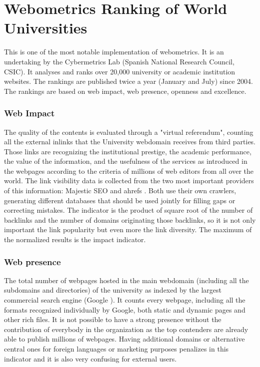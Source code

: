 \section{Webometrics Ranking of World Universities}
This is one of the most notable implementation of webometrics. It is an undertaking by the Cybermetrics Lab (Spanish National Research Council, CSIC). It analyses and ranks over 20,000 university or academic institution websites. The rankings are published twice a year (January and July) since 2004. The rankings are based on web impact, web presence, openness and excellence.

\subsubsection{Web Impact}
The quality of the contents is evaluated through a "virtual referendum", counting all the external inlinks that the University webdomain receives from third parties. Those links are recognizing the institutional prestige, the academic performance, the value of the information, and the usefulness of the services as introduced in the webpages according to the criteria of millions of web editors from all over the world. The link visibility data is collected from the two most important providers of this information: Majestic SEO and ahrefs . Both use their own crawlers, generating different databases that should be used jointly for filling gaps or correcting mistakes. The indicator is the product of square root of the number of backlinks and the number of domains originating those backlinks, so it is not only important the link popularity but even more the link diversity. The maximum of the normalized results is the impact indicator.

\subsubsection{Web presence}
The total number of webpages hosted in the main webdomain (including all the subdomains and directories) of the university as indexed by the largest commercial search engine (Google ). It counts every webpage, including all the formats recognized individually by Google, both static and dynamic pages and other rich files. It is not possible to have a strong presence without the contribution of everybody in the organization as the top contenders are already able to publish millions of webpages. Having additional domains or alternative central ones for foreign languages or marketing purposes penalizes in this indicator and it is also very confusing for external users.

